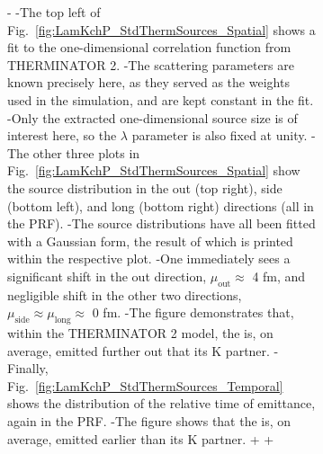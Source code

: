 \begin{figure}[h]
{\begin{table}[htbp]
\begin{figure}[h!]
{-
-The top left of Fig.\ \ref{fig:LamKchP_StdThermSources_Spatial} shows a fit to the one-dimensional correlation function from THERMINATOR 2.
-The scattering parameters are known precisely here, as they served as the weights used in the simulation, and are kept constant in the fit.
-Only the extracted one-dimensional source size is of interest here, so the $\lambda$ parameter is also fixed at unity.
-The other three plots in Fig.\ \ref{fig:LamKchP_StdThermSources_Spatial} show the source distribution in the out (top right), side (bottom left), and long (bottom right) directions (all in the PRF).
-The source distributions have all been fitted with a Gaussian form, the result of which is printed within the respective plot.
-One immediately sees a significant shift in the out direction, $\mu_{\mathrm{out}} \approx$ 4 fm, and negligible shift in the other two directions, $\mu_{\mathrm{side}} \approx \mu_{\mathrm{long}} \approx$ 0 fm.
-The figure demonstrates that, within the THERMINATOR 2 model, the \Lam is, on average, emitted further out that its K partner.
-Finally, Fig.\ \ref{fig:LamKchP_StdThermSources_Temporal} shows the distribution of the relative time of emittance, again in the PRF.
-The figure shows that the \Lam is, on average, emitted earlier than its K partner. 
+
+
 
}
\end{figure}
\end{table}}
\end{figure}

